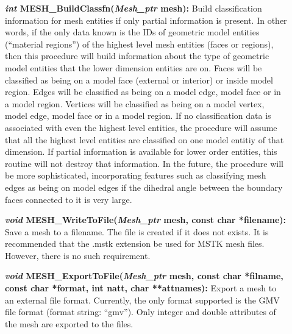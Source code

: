 \documentclass[12pt]{article}
\begin{document}
\begin{description}
  
\item[]\textbf{\textit{int} MESH\_BuildClassfn(\textit{Mesh\_ptr}
    mesh):} Build classification information for mesh entities if only
  partial information is present. In other words, if the only data
  known is the IDs of geometric model entities (``material regions'')
  of the highest level mesh entities (faces or regions), then this
  procedure will build information about the type of geometric model
  entities that the lower dimension entities are on. Faces will be
  classified as being on a model face (external or interior) or inside
  model region. Edges will be classified as being on a model edge,
  model face or in a model region. Vertices will be classified as
  being on a model vertex, model edge, model face or in a model
  region. If no classification data is associated with even the
  highest level entities, the procedure will assume that all the
  highest level entities are classified on one model entitiy of that
  dimension. If partial information is available for lower order
  entities, this routine will not destroy that information. In the
  future, the procedure will be more sophisticated, incorporating
  features such as classifying mesh edges as being on model edges if
  the dihedral angle between the boundary faces connected to it is
  very large.
  
\item[]\textbf{\textit{void} MESH\_WriteToFile(\textit{Mesh\_ptr}
    mesh, const char *filename):} Save a mesh to a filename. The file
  is created if it does not exists. It is recommended that the .mstk
  extension be used for MSTK mesh files.  However, there is no such
  requirement.
  
  
\item[]\textbf{\textit{void} MESH\_ExportToFile(\textit{Mesh\_ptr}
    mesh, const char *filname, const char *format, int natt, char
    **attnames):} Export a mesh to an external file format. Currently,
  the only format supported is the GMV file format (format string:
  ``gmv''). Only integer and double attributes of the mesh are
  exported to the files.


\end{description}
\end{document}
